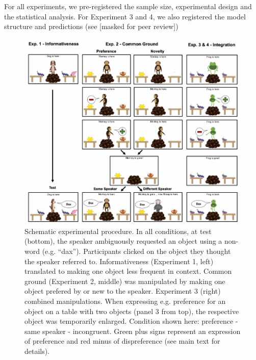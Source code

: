 \documentclass[10pt, letterpaper]{article}
\newenvironment{CodeChunk}{}{}
\begin{document}
For all experiments, we pre-registered the sample size, experimental
design and the statistical analysis. For Experiment 3 and 4, we also
registered the model structure and predictions (see {[}masked for peer
review{]})

\begin{CodeChunk}
\begin{figure}[h]

{\centering \includegraphics{figs/design-1} 

}

\caption[Schematic experimental procedure]{Schematic experimental procedure. In all conditions, at test (bottom), the speaker ambiguously requested an object using a non-word (e.g. “dax”). Participants clicked on the object they thought the speaker referred to. Informativeness (Experiment 1, left) translated to making one object less frequent in context. Common ground (Experiment 2, middle) was manipulated by making one object prefered by or new to the speaker. Experiment 3 (right) combined manipulations. When expressing e.g. preference for an object on a table with two objects (panel 3 from top), the respective object was temporarily enlarged. Condition shown here: preference - same speaker - incongruent. Green plus signs represent an expression of preference and red minus of dispreference (see main text for details).}\label{fig:design}
\end{figure}
\end{CodeChunk}
\end{document}
